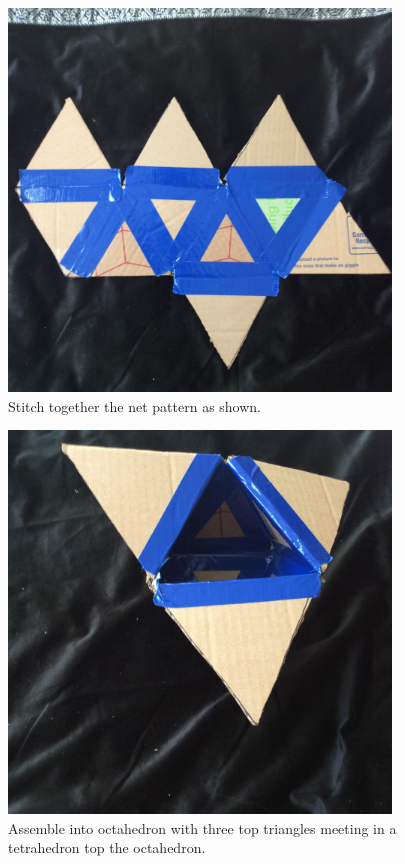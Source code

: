 \begin{figure}
	\centering
	\includegraphics[width=4in]{figures/artboxnet.jpg}
	\caption[artboxtnet]
	{Stitch together the net pattern as shown.}
\end{figure}


\begin{figure}
	\centering
	\includegraphics[width=4in]{figures/artboxassembly.jpg}
	\caption[artboxassembly]
	{Assemble into octahedron with three top triangles meeting in a tetrahedron top the octahedron.}
\end{figure}

